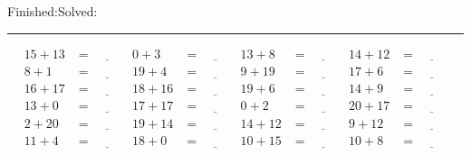 \documentclass{article}
\begin{document}
\begin{sloppy}
\begin{center}
{\selectfont {Started:}\underline{\hspace{1.5cm}}{Finished:}\underline{\hspace{1.5cm}}{Solved:}\underline{\hspace{1.5cm}}}
\end{center}
\hrule
\begin{align*}
    {15} + {13} &= \underline{\hspace{1cm}} & {0} + {3} &= \underline{\hspace{1cm}} & {13} + {8} &= \underline{\hspace{1cm}} & {14} + {12} &= \underline{\hspace{1cm}} \\
    {8} + {1} &= \underline{\hspace{1cm}} & {19} + {4} &= \underline{\hspace{1cm}} & {9} + {19} &= \underline{\hspace{1cm}} & {17} + {6} &= \underline{\hspace{1cm}} \\
    {16} + {17} &= \underline{\hspace{1cm}} & {18} + {16} &= \underline{\hspace{1cm}} & {19} + {6} &= \underline{\hspace{1cm}} & {14} + {9} &= \underline{\hspace{1cm}} \\
    {13} + {0} &= \underline{\hspace{1cm}} & {17} + {17} &= \underline{\hspace{1cm}} & {0} + {2} &= \underline{\hspace{1cm}} & {20} + {17} &= \underline{\hspace{1cm}} \\
    {2} + {20} &= \underline{\hspace{1cm}} & {19} + {14} &= \underline{\hspace{1cm}} & {14} + {12} &= \underline{\hspace{1cm}} & {9} + {12} &= \underline{\hspace{1cm}} \\
    {11} + {4} &= \underline{\hspace{1cm}} & {18} + {0} &= \underline{\hspace{1cm}} & {10} + {15} &= \underline{\hspace{1cm}} & {10} + {8} &= \underline{\hspace{1cm}} \\

\end{align*}
\end{sloppy}
\end{document}
